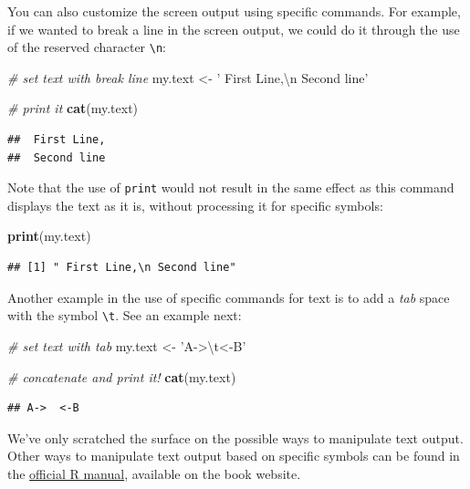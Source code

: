 \documentclass[11pt,]{book}
\newenvironment{Shaded}{\begin{snugshade}}{\end{snugshade}}
\newcommand{\KeywordTok}[1]{\textcolor[rgb]{0.27,0.27,0.27}{\textbf{#1}}}
\newcommand{\CharTok}[1]{\textcolor[rgb]{0.5,0.5,0.5}{#1}}
\newcommand{\StringTok}[1]{\textcolor[rgb]{0.5,0.5,0.5}{#1}}
\newcommand{\CommentTok}[1]{\textcolor[rgb]{0.56,0.35,0.01}{\textit{#1}}}
\newcommand{\NormalTok}[1]{#1}
\begin{document}
You can also customize the screen output using specific commands. For
example, if we wanted to break a line in the screen output, we could do
it through the use of the reserved character \texttt{\textbackslash{}n}:

\begin{Shaded}
\begin{Highlighting}[]
\CommentTok{# set text with break line}
\NormalTok{my.text <-}\StringTok{ ' First Line,}\CharTok{\textbackslash{}n}\StringTok{ Second line'}

\CommentTok{# print it}
\KeywordTok{cat}\NormalTok{(my.text)}
\end{Highlighting}
\end{Shaded}

\begin{verbatim}
##  First Line,
##  Second line
\end{verbatim}

Note that the use of \texttt{print} would not result in the same effect
as this command displays the text as it is, without processing it for
specific symbols:

\begin{Shaded}
\begin{Highlighting}[]
\KeywordTok{print}\NormalTok{(my.text)}
\end{Highlighting}
\end{Shaded}

\begin{verbatim}
## [1] " First Line,\n Second line"
\end{verbatim}

Another example in the use of specific commands for text is to add a
\emph{tab} space with the symbol \texttt{\textbackslash{}t}. See an
example next:

\begin{Shaded}
\begin{Highlighting}[]
\CommentTok{# set text with tab}
\NormalTok{my.text <-}\StringTok{ 'A->}\CharTok{\textbackslash{}t}\StringTok{<-B'}

\CommentTok{# concatenate and print it!}
\KeywordTok{cat}\NormalTok{(my.text)}
\end{Highlighting}
\end{Shaded}

\begin{verbatim}
## A->  <-B
\end{verbatim}

We've only scratched the surface on the possible ways to manipulate text
output. Other ways to manipulate text output based on specific symbols
can be found in the
\href{https://cran.r-project.org/doc/manuals/R-lang.html\#Literal-constants}{official
R manual}, available on the book website.
\end{document}

